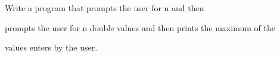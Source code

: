 Write a program that prompts the user for n and then

prompts the user for n double values and then prints the maximum of the

values enters by the user.

